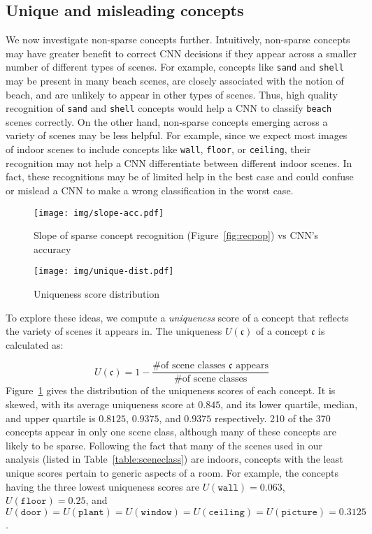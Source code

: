 \documentclass{article}
\begin{document}
\subsection{Unique and misleading concepts}
We now investigate non-sparse concepts further. Intuitively, non-sparse concepts may have greater
benefit to correct CNN decisions if they appear across a smaller
number of different types of scenes. For example, concepts
like \texttt{sand} and \texttt{shell} may be present 
in many beach scenes, are closely associated with the notion of beach, and are unlikely to 
appear in other types of scenes. Thus, 
high quality recognition of \texttt{sand} and \texttt{shell}
concepts would help a CNN to classify \texttt{beach} scenes correctly. On the other hand, 
non-sparse concepts emerging across a variety of scenes may be less helpful. For example, 
since we expect most images of indoor scenes 
to include concepts like \texttt{wall}, \texttt{floor}, or \texttt{ceiling}, their recognition 
may not help a CNN differentiate between different indoor scenes. In fact, these recognitions
may be of limited help in the best case and could confuse or mislead a CNN to make a wrong 
classification in the worst case. 

\begin{figure}
\centering
\begin{minipage}{.46\textwidth}
\vspace{6px}
  \texttt{[image: img/slope-acc.pdf]}
\caption{Slope of sparse concept recognition (Figure~\ref{fig:recpop}) vs CNN's accuracy}
\label{fig:slopeacc}
\end{minipage}%
\hspace{20px}
\begin{minipage}{.48\textwidth}
\texttt{[image: img/unique-dist.pdf]}
\caption{Uniqueness score distribution}
\label{fig:uniquedist}
\end{minipage}
\end{figure}


To explore these ideas, we compute a {\em uniqueness} score of a concept that 
reflects the variety of scenes it appears in. 
The uniqueness $U(\mathfrak{c})$ of a concept $\mathfrak{c}$ is calculated as:
 
$$U(\mathfrak{c}) = 1-\frac{\text{\# of scene classes $\mathfrak{c}$ appears}}{\text{\# of scene classes}}$$
Figure~\ref{fig:uniquedist} gives the distribution of the uniqueness scores of each concept.
It is skewed, with its average uniqueness score at $0.845$, and its lower quartile, median, and upper quartile
is $0.8125$, $0.9375$, and $0.9375$ respectively.
210 of the 370 concepts appear in only one scene class, although many of these concepts are likely to be sparse. Following the fact that many
of the scenes used in our analysis (listed in Table~\ref{table:sceneclass}) are indoors, concepts
with the least unique scores pertain to generic aspects of a room. For example, the 
concepts having the three lowest uniqueness scores are $U(\mathtt{wall}) = 0.063$, 
$U(\mathtt{floor}) = 0.25$, and $U(\mathtt{door}) = U(\mathtt{plant}) = U(\mathtt{window}) = U(\mathtt{ceiling}) = U(\mathtt{picture}) = 0.3125$. 
\end{document}
